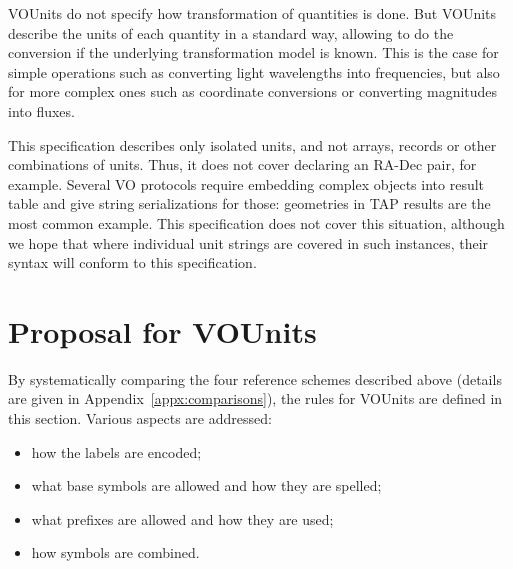 \documentclass[11pt,notitlepage,onecolumn]{ivoa}
\def\eg{e.g.~}
\newcommand{\violet}{\textcolor[rgb]{0.50,0.00,0.50}}
\begin{document}
VOUnits do not specify how transformation of quantities is done. But VOUnits describe the
units of each quantity in a standard way, allowing to do the conversion if the underlying transformation 
model is known. This is the case for simple operations such as converting light wavelengths into
frequencies, but also for more complex ones such as coordinate conversions or converting
magnitudes into fluxes.


This specification describes only isolated units, and not arrays,
records or other combinations of units.  Thus, it does not cover
declaring an RA-Dec pair, for example. Several VO protocols require
embedding complex objects into result table and give string
serializations for those: geometries in TAP results are the most
common example.  This specification does not cover this situation,
although we hope that where individual unit strings are covered in
such instances, their syntax will conform to this specification.

\section{Proposal for VOUnits\label{sec:proposal}}

By systematically comparing the four reference schemes described above (details are given in Appendix~\ref{appx:comparisons}), 
the rules for VOUnits are defined in this section.
Various aspects are addressed:
\begin{itemize}
\item how the labels are encoded;
\item what base symbols are allowed and how they are spelled;
\item what prefixes are allowed and how they are used;
\item how symbols are combined.
\end{itemize}
\end{document}
